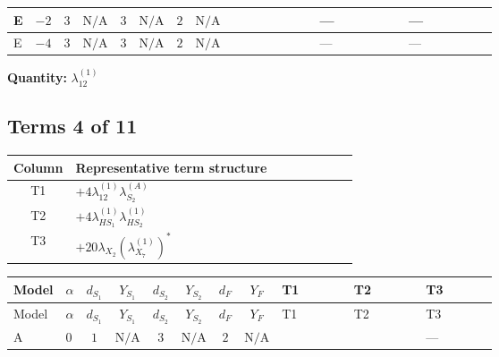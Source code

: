 \documentclass[8pt]{article}
\begin{document}
\begin{landscape}
\begin{longtable}{@{}llcccccc >{\raggedright\arraybackslash}p{0.21\linewidth} >{\raggedright\arraybackslash}p{0.21\linewidth} >{\raggedright\arraybackslash}p{0.21\linewidth}@{}}
\midrule
E & $-2$ & $3$ & $\text{N/A}$ & $3$ & $\text{N/A}$ & $2$ & $\text{N/A}$ & \scriptsize\adjustbox{max width=\linewidth}{$\begin{gathered} +4 {\lambda_{12}^{(1)}}^2\end{gathered}$} & --- & --- \\
\midrule
E & $-4$ & $3$ & $\text{N/A}$ & $3$ & $\text{N/A}$ & $2$ & $\text{N/A}$ & \scriptsize\adjustbox{max width=\linewidth}{$\begin{gathered} +4 {\lambda_{12}^{(1)}}^2\end{gathered}$} & --- & --- \\
\midrule
\bottomrule
\end{longtable}
\clearpage
\noindent\textbf{Quantity: }$\lambda_{12}^{(1)}$\par\smallskip
\subsection*{Terms 4 of 11}
\begin{center}
\begin{tabular}{@{}c >{\raggedright\arraybackslash}p{0.82\linewidth}@{}}
\toprule
Column & Representative term structure \\
\midrule
T1 & \(\displaystyle +4 {\lambda_{12}^{(1)}} {\lambda_{S_2}^{(A)}}\) \\
\midrule
T2 & \(\displaystyle +4 {\lambda_{HS_1}^{(1)}} {\lambda_{HS_2}^{(1)}}\) \\
\midrule
T3 & \(\displaystyle +20 {\lambda_{X_{2}}} \left({\lambda_{X_{7}}^{(1)}}\right)^{*}\) \\
\midrule
\bottomrule
\end{tabular}
\end{center}
\smallskip
\tiny
\begin{longtable}{@{}llcccccc >{\raggedright\arraybackslash}p{0.21\linewidth} >{\raggedright\arraybackslash}p{0.21\linewidth} >{\raggedright\arraybackslash}p{0.21\linewidth}@{}}
\toprule
Model & $\alpha$ & $d_{S_1}$ & $Y_{S_1}$ & $d_{S_2}$ & $Y_{S_2}$ & $d_F$ & $Y_F$ & T1 & T2 & T3 \\
\midrule
\endfirsthead
\toprule
Model & $\alpha$ & $d_{S_1}$ & $Y_{S_1}$ & $d_{S_2}$ & $Y_{S_2}$ & $d_F$ & $Y_F$ & T1 & T2 & T3 \\
\midrule
\endhead
A & $0$ & $1$ & $\text{N/A}$ & $3$ & $\text{N/A}$ & $2$ & $\text{N/A}$ & \scriptsize\adjustbox{max width=\linewidth}{$\begin{gathered} +4 {\lambda_{12}^{(1)}} {\lambda_{S_2}^{(A)}}\end{gathered}$} & \scriptsize\adjustbox{max width=\linewidth}{$\begin{gathered} +4 {\lambda_{HS_1}^{(1)}} {\lambda_{HS_2}^{(1)}}\end{gathered}$} & --- \\

\end{longtable}
\end{landscape}
\end{document}
